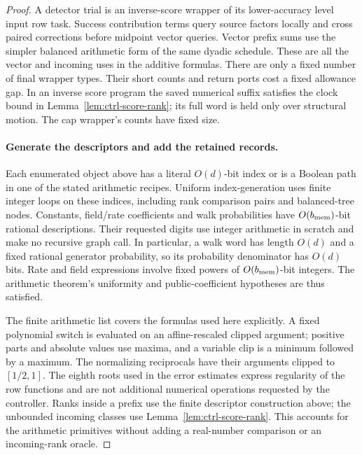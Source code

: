 \documentclass[11pt]{article}
\numberwithin{equation}{section}
\theoremstyle{definition}
\theoremstyle{remark}
\begin{document}
\begin{proof}
A detector trial is an inverse-score wrapper of its lower-accuracy level
input row task.  Success contribution terms query source factors locally and cross
paired corrections before midpoint vector queries.  Vector prefix sums
use the simpler balanced arithmetic form of the same dyadic schedule.
These are all the vector and incoming uses in the additive formulas.
There are only a fixed number of final wrapper types.  Their short
counts and return ports cost a fixed allowance gap.  In an inverse
score program the saved numerical suffix satisfies the clock bound in
Lemma~\ref{lem:ctrl-score-rank}; its full word is held only over
structural motion.  The cap wrapper's counts have fixed size.

\paragraph{Generate the descriptors and add the retained records.}
Each enumerated object above has a literal $O(d)$-bit index or is a
Boolean path in one of the stated arithmetic recipes.  Uniform
index-generation uses finite integer loops on these indices, including
rank comparison pairs and balanced-tree nodes.  Constants, field/rate
coefficients and walk probabilities have $O({b_{\rm mem}})$-bit rational
descriptions.  Their requested digits use integer arithmetic in scratch
and make no recursive graph call.  In particular, a walk word has
length $O(d)$ and a fixed rational generator probability, so its
probability denominator has $O(d)$ bits.  Rate and field expressions
involve fixed powers of $O({b_{\rm mem}})$-bit integers.  The arithmetic theorem's
uniformity and public-coefficient hypotheses are thus satisfied.

The finite arithmetic list covers the formulas used here explicitly.
A fixed polynomial switch is evaluated on an affine-rescaled clipped
argument; positive parts and absolute values use maxima, and a variable
clip is a minimum followed by a maximum.  The normalizing reciprocals
have their arguments clipped to $[1/2,1]$.  The eighth roots used in the
error estimates express regularity of the row functions and are not
additional numerical operations requested by the controller.  Ranks
inside a prefix use the finite descriptor construction above; the
unbounded incoming classes use Lemma~\ref{lem:ctrl-score-rank}.  This
accounts for the arithmetic primitives without adding a real-number
comparison or an incoming-rank oracle.


\end{proof}
\end{document}

